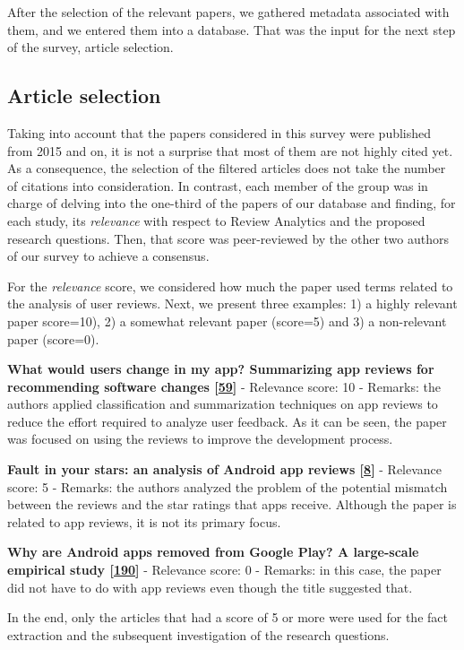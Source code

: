 \documentclass[]{book}
\begin{document}
After the selection of the relevant papers, we gathered metadata
associated with them, and we entered them into a database. That was the
input for the next step of the survey, article selection.

\subsection{Article selection}\label{article-selection}

Taking into account that the papers considered in this survey were
published from 2015 and on, it is not a surprise that most of them are
not highly cited yet. As a consequence, the selection of the filtered
articles does not take the number of citations into consideration. In
contrast, each member of the group was in charge of delving into the
one-third of the papers of our database and finding, for each study, its
\emph{relevance} with respect to Review Analytics and the proposed
research questions. Then, that score was peer-reviewed by the other two
authors of our survey to achieve a consensus.

For the \emph{relevance} score, we considered how much the paper used
terms related to the analysis of user reviews. Next, we present three
examples: 1) a highly relevant paper score=10), 2) a somewhat relevant
paper (score=5) and 3) a non-relevant paper (score=0).

\textbf{What would users change in my app? Summarizing app reviews for
recommending software changes
{[}\protect\hyperlink{ref-di2016would}{59}{]}} - Relevance score: 10 -
Remarks: the authors applied classification and summarization techniques
on app reviews to reduce the effort required to analyze user feedback.
As it can be seen, the paper was focused on using the reviews to improve
the development process.

\textbf{Fault in your stars: an analysis of Android app reviews
{[}\protect\hyperlink{ref-aralikatte2018fault}{8}{]}} - Relevance score:
5 - Remarks: the authors analyzed the problem of the potential mismatch
between the reviews and the star ratings that apps receive. Although the
paper is related to app reviews, it is not its primary focus.

\textbf{Why are Android apps removed from Google Play? A large-scale
empirical study {[}\protect\hyperlink{ref-wang2018android}{190}{]}} -
Relevance score: 0 - Remarks: in this case, the paper did not have to do
with app reviews even though the title suggested that.

In the end, only the articles that had a score of 5 or more were used
for the fact extraction and the subsequent investigation of the research
questions.
\end{document}
